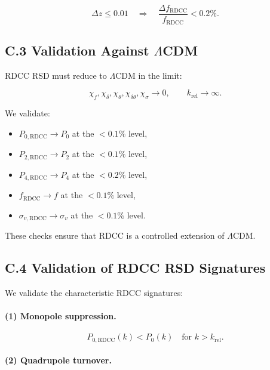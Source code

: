\documentclass[11pt,a4paper]{article}
\begin{document}
\[
\Delta z \leq 0.01
\quad \Rightarrow \quad
\frac{\Delta f_{\mathrm{RDCC}}}{f_{\mathrm{RDCC}}} < 0.2\%.
\]



\subsection*{C.3 Validation Against $\Lambda$CDM}

RDCC RSD must reduce to $\Lambda$CDM in the limit:


\[
\chi_{f},\chi_{\delta},\chi_{\theta},\chi_{\delta\theta},\chi_{\sigma} \rightarrow 0,
\qquad
k_{\mathrm{rel}} \rightarrow \infty.
\]



We validate:
\begin{itemize}
\item $P_{0,\mathrm{RDCC}} \rightarrow P_{0}$ at the $<0.1\%$ level,
\item $P_{2,\mathrm{RDCC}} \rightarrow P_{2}$ at the $<0.1\%$ level,
\item $P_{4,\mathrm{RDCC}} \rightarrow P_{4}$ at the $<0.2\%$ level,
\item $f_{\mathrm{RDCC}} \rightarrow f$ at the $<0.1\%$ level,
\item $\sigma_{v,\mathrm{RDCC}} \rightarrow \sigma_{v}$ at the $<0.1\%$ level.
\end{itemize}

These checks ensure that RDCC is a controlled extension of $\Lambda$CDM.

\subsection*{C.4 Validation of RDCC RSD Signatures}

We validate the characteristic RDCC signatures:

\paragraph{(1) Monopole suppression.}


\[
P_{0,\mathrm{RDCC}}(k)
<
P_{0}(k)
\quad \text{for } k > k_{\mathrm{rel}}.
\]



\paragraph{(2) Quadrupole turnover.}
\end{document}
